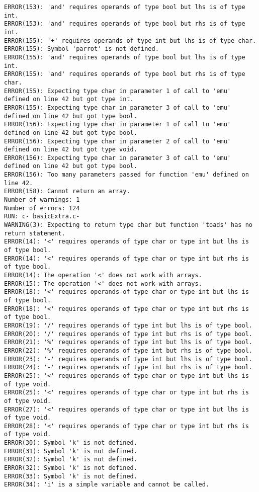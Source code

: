 \documentclass[12pt]{book}
\begin{document}
\begin{lstlisting}
ERROR(153): 'and' requires operands of type bool but lhs is of type int.
ERROR(153): 'and' requires operands of type bool but rhs is of type int.
ERROR(155): '+' requires operands of type int but lhs is of type char.
ERROR(155): Symbol 'parrot' is not defined.
ERROR(155): 'and' requires operands of type bool but lhs is of type int.
ERROR(155): 'and' requires operands of type bool but rhs is of type char.
ERROR(155): Expecting type char in parameter 1 of call to 'emu' defined on line 42 but got type int.
ERROR(155): Expecting type char in parameter 3 of call to 'emu' defined on line 42 but got type bool.
ERROR(156): Expecting type char in parameter 1 of call to 'emu' defined on line 42 but got type bool.
ERROR(156): Expecting type char in parameter 2 of call to 'emu' defined on line 42 but got type void.
ERROR(156): Expecting type char in parameter 3 of call to 'emu' defined on line 42 but got type bool.
ERROR(156): Too many parameters passed for function 'emu' defined on line 42.
ERROR(158): Cannot return an array.
Number of warnings: 1
Number of errors: 124
RUN: c- basicExtra.c-
WARNING(3): Expecting to return type char but function 'toads' has no return statement.
ERROR(14): '<' requires operands of type char or type int but lhs is of type bool.
ERROR(14): '<' requires operands of type char or type int but rhs is of type bool.
ERROR(14): The operation '<' does not work with arrays.
ERROR(15): The operation '<' does not work with arrays.
ERROR(18): '<' requires operands of type char or type int but lhs is of type bool.
ERROR(18): '<' requires operands of type char or type int but rhs is of type bool.
ERROR(19): '/' requires operands of type int but lhs is of type bool.
ERROR(20): '/' requires operands of type int but rhs is of type bool.
ERROR(21): '%' requires operands of type int but lhs is of type bool.
ERROR(22): '%' requires operands of type int but rhs is of type bool.
ERROR(23): '-' requires operands of type int but lhs is of type bool.
ERROR(24): '-' requires operands of type int but rhs is of type bool.
ERROR(25): '<' requires operands of type char or type int but lhs is of type void.
ERROR(25): '<' requires operands of type char or type int but rhs is of type void.
ERROR(27): '<' requires operands of type char or type int but lhs is of type void.
ERROR(28): '<' requires operands of type char or type int but rhs is of type void.
ERROR(30): Symbol 'k' is not defined.
ERROR(31): Symbol 'k' is not defined.
ERROR(32): Symbol 'k' is not defined.
ERROR(32): Symbol 'k' is not defined.
ERROR(33): Symbol 'k' is not defined.
ERROR(34): 'i' is a simple variable and cannot be called.

\end{lstlisting}
\end{document}
